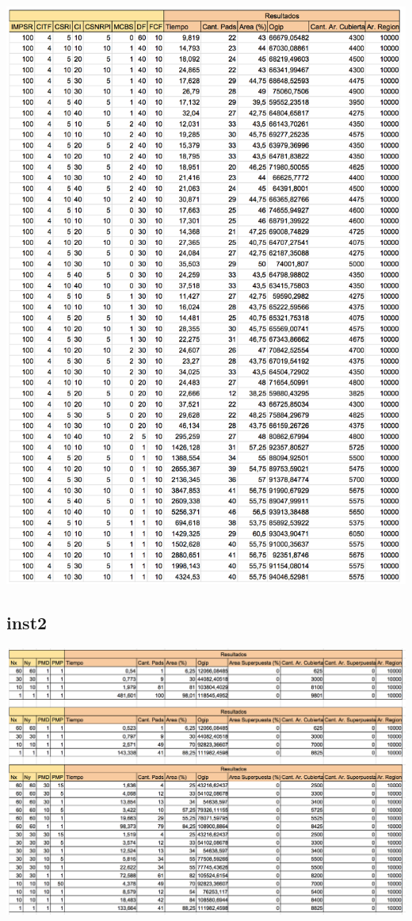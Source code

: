\begin{center}
\includegraphics[width=1\textwidth]{imagenes/45G100x100_muchos_V2}
\end{center}

\subsection{inst2}

\begin{center}
\includegraphics[width=1\textwidth]{imagenes/ALL_inst2}
\end{center}


